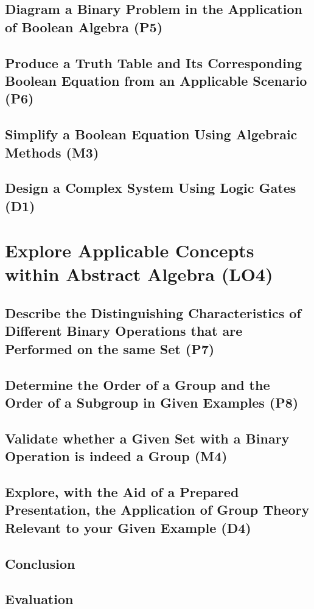 \documentclass[12pt, a4paper]{report} %
\begin{document}
\section{Diagram a Binary Problem in the Application of Boolean Algebra (P5)}
\label{sec:P5}

\section{Produce a Truth Table and Its Corresponding Boolean Equation from an Applicable Scenario (P6)}
\label{sec:P6}

\section{Simplify a Boolean Equation Using Algebraic Methods (M3)}
\label{sec:M3}

\section{Design a Complex System Using Logic Gates (D1)}
\label{sec:D1}

\chapter{Explore Applicable Concepts within Abstract Algebra (LO4)}
\label{chap:LO4}

\section{Describe the Distinguishing Characteristics of Different Binary Operations that are Performed on the same Set (P7)}
\label{sec:P7}

\section{Determine the Order of a Group and the Order of a Subgroup in Given Examples (P8)}
\label{sec:P8}

\section{Validate whether a Given Set with a Binary Operation is indeed a Group (M4)}
\label{sec:M4}

\section{Explore, with the Aid of a Prepared Presentation, the Application of Group Theory Relevant to your Given Example (D4)}
\label{sec:D4}


\cite{doe2021}
\newpage
\section*{Conclusion}
\newpage
\section*{Evaluation}


\end{document}
